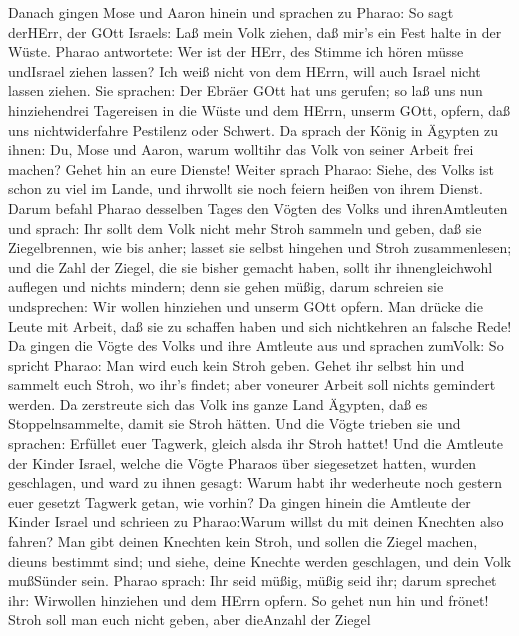  Danach gingen Mose und Aaron hinein und sprachen zu Pharao:
So sagt derHErr, der GOtt Israels: Laß mein Volk ziehen, daß mir's ein
Fest halte in der Wüste.  Pharao antwortete: Wer ist der
HErr, des Stimme ich hören müsse undIsrael ziehen lassen? Ich weiß nicht
von dem HErrn, will auch Israel nicht lassen ziehen.  Sie
sprachen: Der Ebräer GOtt hat uns gerufen; so laß uns nun hinziehendrei
Tagereisen in die Wüste und dem HErrn, unserm GOtt, opfern, daß uns
nichtwiderfahre Pestilenz oder Schwert.  Da sprach der König
in Ägypten zu ihnen: Du, Mose und Aaron, warum wolltihr das Volk von
seiner Arbeit frei machen? Gehet hin an eure Dienste! 
Weiter sprach Pharao: Siehe, des Volks ist schon zu viel im Lande, und
ihrwollt sie noch feiern heißen von ihrem Dienst.  Darum
befahl Pharao desselben Tages den Vögten des Volks und ihrenAmtleuten
und sprach:  Ihr sollt dem Volk nicht mehr Stroh sammeln und
geben, daß sie Ziegelbrennen, wie bis anher; lasset sie selbst hingehen
und Stroh zusammenlesen;  und die Zahl der Ziegel, die sie
bisher gemacht haben, sollt ihr ihnengleichwohl auflegen und nichts
mindern; denn sie gehen müßig, darum schreien sie undsprechen: Wir
wollen hinziehen und unserm GOtt opfern.  Man drücke die
Leute mit Arbeit, daß sie zu schaffen haben und sich nichtkehren an
falsche Rede!  Da gingen die Vögte des Volks und ihre
Amtleute aus und sprachen zumVolk: So spricht Pharao: Man wird euch kein
Stroh geben.  Gehet ihr selbst hin und sammelt euch Stroh,
wo ihr's findet; aber voneurer Arbeit soll nichts gemindert werden.
 Da zerstreute sich das Volk ins ganze Land Ägypten, daß es
Stoppelnsammelte, damit sie Stroh hätten.  Und die Vögte
trieben sie und sprachen: Erfüllet euer Tagwerk, gleich alsda ihr Stroh
hattet!  Und die Amtleute der Kinder Israel, welche die
Vögte Pharaos über siegesetzet hatten, wurden geschlagen, und ward zu
ihnen gesagt: Warum habt ihr wederheute noch gestern euer gesetzt
Tagwerk getan, wie vorhin?  Da gingen hinein die Amtleute
der Kinder Israel und schrieen zu Pharao:Warum willst du mit deinen
Knechten also fahren?  Man gibt deinen Knechten kein Stroh,
und sollen die Ziegel machen, dieuns bestimmt sind; und siehe, deine
Knechte werden geschlagen, und dein Volk mußSünder sein. 
Pharao sprach: Ihr seid müßig, müßig seid ihr; darum sprechet ihr:
Wirwollen hinziehen und dem HErrn opfern.  So gehet nun hin
und frönet! Stroh soll man euch nicht geben, aber dieAnzahl der Ziegel
